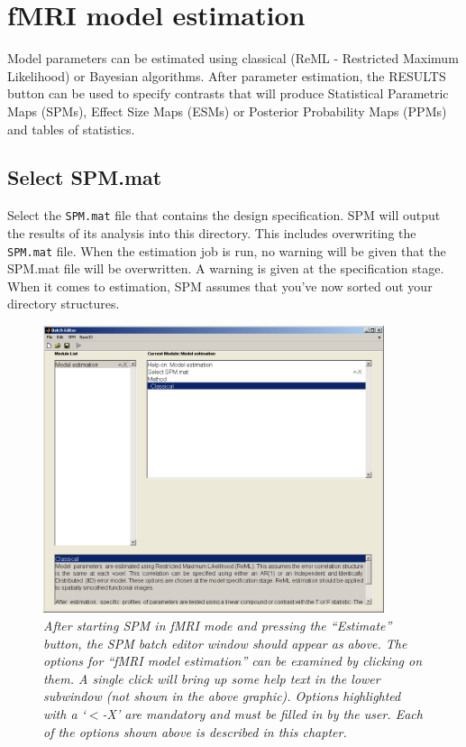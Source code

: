 \chapter{fMRI model estimation \label{Chap:fmri_est}}

Model parameters can be estimated using classical (ReML - Restricted Maximum Likelihood) or Bayesian algorithms. After parameter estimation, the RESULTS button can be used to specify contrasts that will produce Statistical Parametric Maps (SPMs), Effect Size Maps (ESMs) or Posterior Probability Maps (PPMs) and tables of statistics. 

\section{Select SPM.mat}

Select the \texttt{SPM.mat} file that contains the design specification. SPM will output the results of its analysis into this directory. This includes overwriting the \texttt{SPM.mat} file. When the estimation job is run, no warning will be given that the SPM.mat file will be overwritten. A warning is given at the specification stage. When it comes to estimation, SPM assumes that you've now sorted out your directory structures.

\begin{figure}
\begin{center}
\includegraphics[width=100mm]{fmri_est/est_method}
\end{center}
\caption{\em After starting SPM in fMRI mode and pressing the ``Estimate'' button, the SPM batch editor window should appear as above. The options for ``fMRI model estimation'' can be examined by clicking on them. A single click will bring up some help text in the lower subwindow (not shown in the above graphic). Options highlighted with a `$<$-X' are mandatory and must be filled in by the user. Each of the options shown above is described in this chapter. \label{est}}
\end{figure}

